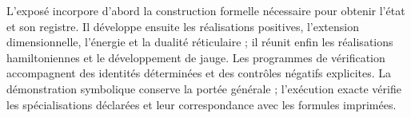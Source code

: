 L'exposé incorpore d'abord la construction formelle nécessaire pour obtenir l'état et son registre. Il développe ensuite les réalisations positives, l'extension dimensionnelle, l'énergie et la dualité réticulaire ; il réunit enfin les réalisations hamiltoniennes et le développement de jauge. Les programmes de vérification accompagnent des identités déterminées et des contrôles négatifs explicites. La démonstration symbolique conserve la portée générale ; l'exécution exacte vérifie les spécialisations déclarées et leur correspondance avec les formules imprimées.
